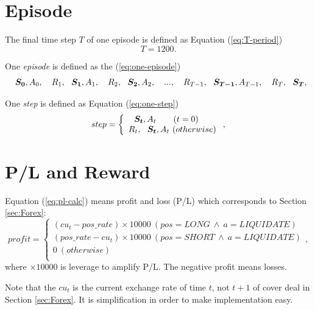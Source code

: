 \section{Episode}
The final time step $T$ of one episode is defined as Equation (\ref{eq:T-period}) 
\begin{equation}
  \label{eq:T-period}
  T = 1200.
\end{equation}

One {\it episode} is defined as the (\ref{eq:one-episode})  
\begin{equation}
  \label{eq:one-episode}
  \mbox{ \boldmath{ $ S_{0} $}}, A_{0}, \quad R_{1}, \mbox{ \boldmath{ $ S_{1} $}}, A_{1}, \quad R_{2}, \mbox{ \boldmath{ $ S_{2} $}}, A_{2}, \quad ...,\quad  R_{T-1}, \mbox{ \boldmath{ $ S_{T-1} $}}, A_{T-1}, \quad R_{T}, \mbox{ \boldmath{ $ S_{T} $}},
\end{equation}

One {\it step} is defined as Equation (\ref{eq:one-step})
\begin{equation}
  \label{eq:one-step}
  step = 
  \left\{
    \begin{array}{l}
      \mbox{ \boldmath{ $ S_{t} $}}, A_{t}       \qquad (t=0)\\
      R_{t}, \mbox{ \boldmath{ $ S_{t} $}}, A_{t} \ (otherwise)\\
    \end{array}
  \right.,
\end{equation}


\section{P/L and Reward}
\label{sec:pl_reward}
Equation (\ref{eq:pl-calc}) means profit and loss (P/L) which corresponds to Section \ref{sec:Forex}:
\begin{equation}
  \label{eq:pl-calc}
  profit =
  \left\{
    \begin{array}{l}
      (cu_{t} - pos\_rate) \times 10000  \ (pos=LONG \ \land \ a= LIQUIDATE)\\
      (pos\_rate - cu_{t}) \times 10000  \ (pos=SHORT\ \land \ a= LIQUIDATE)\\
      0                          \ (otherwise)\\
    \end{array}
  \right.,
\end{equation}
where $\times 10000$ is leverage to amplify P/L. The negative profit means losses.

Note that the $cu_{t}$ is the current exchange rate of time $t$, not $t+1$ of cover deal in Section \ref{sec:Forex}. It is simplification in order to make implementation easy.

